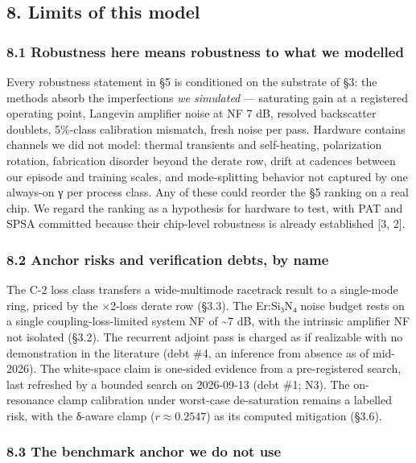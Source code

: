 \documentclass[
  10pt,
]{article}
\begin{document}
\subsection{8. Limits of this model}\label{limits-of-this-model}

\subsubsection{8.1 Robustness here means robustness to what we
modelled}\label{robustness-here-means-robustness-to-what-we-modelled}

Every robustness statement in §5 is conditioned on the substrate of §3:
the methods absorb the imperfections \emph{we simulated} --- saturating
gain at a registered operating point, Langevin amplifier noise at NF 7
dB, resolved backscatter doublets, 5\%-class calibration mismatch, fresh
noise per pass. Hardware contains channels we did not model: thermal
transients and self-heating, polarization rotation, fabrication disorder
beyond the derate row, drift at cadences between our episode and
training scales, and mode-splitting behavior not captured by one
always-on γ per process class. Any of these could reorder the §5 ranking
on a real chip. We regard the ranking as a hypothesis for hardware to
test, with PAT and SPSA committed because their chip-level robustness is
already established {[}3, 2{]}.

\subsubsection{8.2 Anchor risks and verification debts, by
name}\label{anchor-risks-and-verification-debts-by-name}

The C-2 loss class transfers a wide-multimode racetrack result to a
single-mode ring, priced by the ×2-loss derate row (§3.3). The Er:Si₃N₄
noise budget rests on a single coupling-loss-limited system NF of
\textasciitilde7 dB, with the intrinsic amplifier NF not isolated
(§3.2). The recurrent adjoint pass is charged as if realizable with no
demonstration in the literature (debt \#4, an inference from absence as
of mid-2026). The white-space claim is one-sided evidence from a
pre-registered search, last refreshed by a bounded search on 2026-09-13
(debt \#1; N3). The on-resonance clamp calibration under worst-case
de-saturation remains a labelled risk, with the δ-aware clamp
(\(r \approx 0.2547\)) as its computed mitigation (§3.6).

\subsubsection{8.3 The benchmark anchor we do not
use}\label{the-benchmark-anchor-we-do-not-use}
\end{document}
